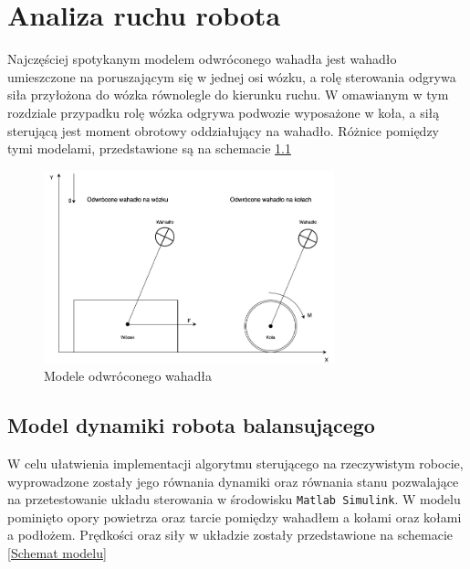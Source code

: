 \chapter{Analiza ruchu robota}
Najczęściej spotykanym modelem odwróconego wahadła jest wahadło umieszczone na poruszającym się w jednej osi wózku, a rolę sterowania odgrywa siła przyłożona do wózka równolegle do kierunku ruchu. W omawianym w tym rozdziale przypadku rolę wózka odgrywa podwozie wyposażone w koła, a siłą sterującą jest moment obrotowy oddziałujący na wahadło. Różnice pomiędzy tymi modelami, przedstawione są na schemacie \ref{Modele odwroconego wahadla}

    \begin{figure}[h!]
	    \centering
	    \includegraphics[width=0.75\textwidth]{Rysunki/Rozdzial02/Schemat_wozek_kola.png}
	    \caption{Modele odwróconego wahadła}
	    \label{Modele odwroconego wahadla}
	\end{figure}

\section{Model dynamiki robota balansującego}

W celu ułatwienia implementacji algorytmu sterującego na rzeczywistym robocie, wyprowadzone zostały jego równania dynamiki oraz równania stanu pozwalające na przetestowanie układu sterowania w środowisku \texttt{Matlab Simulink}. W modelu pominięto opory powietrza oraz tarcie pomiędzy wahadłem a kołami oraz kołami a podłożem. Prędkości oraz siły w układzie zostały przedstawione na schemacie \ref{Schemat modelu}

